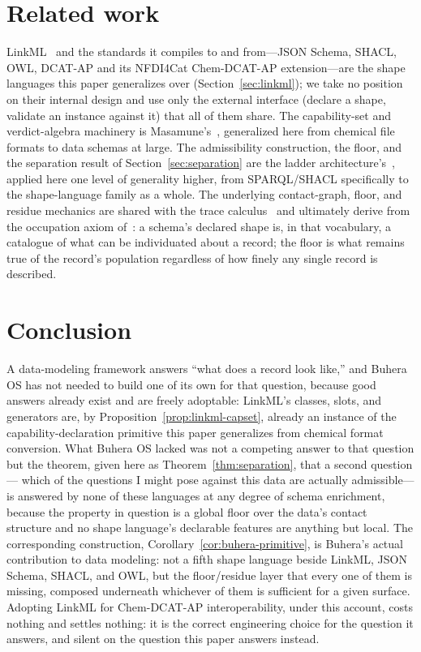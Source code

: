 \documentclass[11pt,a4paper,twocolumn]{article}
\theoremstyle{definition}
\theoremstyle{remark}
\begin{document}
\section{Related work}
\label{sec:related}

LinkML~\cite{linkml} and the standards it compiles to and from---JSON Schema,
SHACL, OWL, DCAT-AP and its NFDI4Cat Chem-DCAT-AP
extension---are the shape languages this paper generalizes over
(Section~\ref{sec:linkml}); we take no position on their internal design and use
only the external interface (declare a shape, validate an instance against it)
that all of them share. The capability-set and verdict-algebra machinery is
Masamune's~\cite{masamune}, generalized here from chemical file formats to data
schemas at large. The admissibility construction, the floor, and the
separation result of Section~\ref{sec:separation} are the ladder
architecture's~\cite{ladder}, applied here one level of generality higher, from
SPARQL/SHACL specifically to the shape-language family as a whole. The
underlying contact-graph, floor, and residue mechanics are shared with the
trace calculus~\cite{trace} and ultimately derive from the occupation axiom
of~\cite{occupation}: a schema's declared shape is, in that vocabulary, a
catalogue of what can be individuated about a record; the floor is what remains
true of the record's population regardless of how finely any single record is
described.

\section{Conclusion}
\label{sec:conclusion}

A data-modeling framework answers ``what does a record look like,'' and Buhera OS
has not needed to build one of its own for that question, because good answers
already exist and are freely adoptable: LinkML's classes, slots, and generators
are, by Proposition~\ref{prop:linkml-capset}, already an instance of the
capability-declaration primitive this paper generalizes from chemical format
conversion. What Buhera OS lacked was not a competing answer to that question but
the theorem, given here as Theorem~\ref{thm:separation}, that a second question---
which of the questions I might pose against this data are actually
admissible---is answered by none of these languages at any degree of schema
enrichment, because the property in question is a global floor over the data's
contact structure and no shape language's declarable features are anything but
local. The corresponding construction, Corollary~\ref{cor:buhera-primitive}, is
Buhera's actual contribution to data modeling: not a fifth shape language beside
LinkML, JSON Schema, SHACL, and OWL, but the floor/residue layer that every one
of them is missing, composed underneath whichever of them is sufficient for a
given surface. Adopting LinkML for Chem-DCAT-AP interoperability, under this
account, costs nothing and settles nothing: it is the correct engineering choice
for the question it answers, and silent on the question this paper answers
instead.



\end{document}

